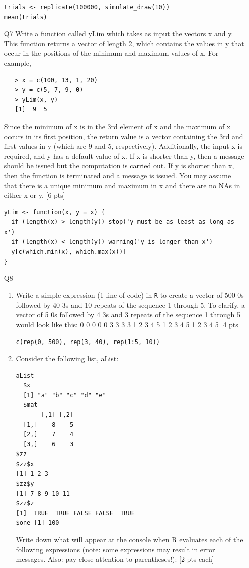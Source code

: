 \documentclass[12pt]{article}
\theoremstyle{Conjecture}
\theoremstyle{example}
\theoremstyle{remark}
\theoremstyle{lemma}
\theoremstyle{definition}
\theoremstyle{corol}
\theoremstyle{proposition}
\theoremstyle{condition}
\begin{document}
\begin{enumerate}
{\begin{verbatim}
trials <- replicate(100000, simulate_draw(10))
mean(trials)
\end{verbatim}
}
  \newpage

\item [Q7] Write a function called yLim which takes as input the 
  vectors x and y. This function returns a vector of length 2, which 
  contains the values in y that occur in the positions of the minimum 
  and maximum values of x. For example, 
\begin{verbatim}
   > x = c(100, 13, 1, 20) 
   > y = c(5, 7, 9, 0) 
   > yLim(x, y) 
   [1]  9  5 
\end{verbatim}
  Since the minimum of x is in the 3rd element of x and the maximum of
  x occurs in its first position, the return value is a vector
  containing the 3rd and first values in y (which are 9 and 5,
  respectively).  Additionally, the input x is required, and y has a
  default value of x. If x is shorter than y, then a message should be
  issued but the computation is carried out. If y is shorter than x,
  then the function is terminated and a message is issued. You may
  assume that there is a unique minimum and maximum in x and there are
  no NAs in either x or y. [6 pts]

  {\color{blue}
  \begin{verbatim}
yLim <- function(x, y = x) {
  if (length(x) > length(y)) stop('y must be as least as long as x')
  if (length(x) < length(y)) warning('y is longer than x')
  y[c(which.min(x), which.max(x))]
}
  \end{verbatim}
  }

\newpage 
\item [Q8] \begin{enumerate} 
  \item Write a simple expression (1 line of code) in {\tt R} to
    create a vector of 500 0s followed by 40 3s and 10 repeats of the
    sequence 1 through 5. To clarify, a vector of 5 0s followed by 4
    3s and 3 repeats of the sequence 1 through 5 would look like this:
    0 0 0 0 0 3 3 3 3 1 2 3 4 5 1 2 3 4 5 1 2 3 4 5 [4 pts]

  {\color{blue}\tt c(rep(0, 500), rep(3, 40), rep(1:5, 10))}
\item Consider the following list, aList:
\begin{verbatim}
aList
  $x
  [1] "a" "b" "c" "d" "e"
  $mat
       [,1] [,2]
  [1,]    8    5
  [2,]    7    4
  [3,]    6    3
$zz
$zz$x
[1] 1 2 3
$zz$y
[1] 7 8 9 10 11
$zz$z
[1]  TRUE  TRUE FALSE FALSE  TRUE
$one [1] 100
\end{verbatim}
Write down what will appear at the console when R evaluates each of 
the following expressions (note: some expressions may result in 
 error messages. Also: pay close attention to parentheses!): [2 pts each] 


\end{enumerate}
\end{enumerate}
\end{document}
